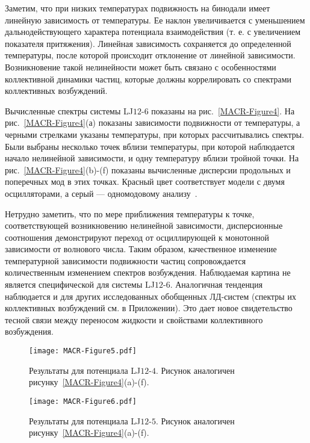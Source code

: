 Заметим, что при низких температурах подвижность на бинодали имеет линейную зависимость от температуры. Ее наклон увеличивается с уменьшением дальнодействующего характера потенциала взаимодействия (т. е. с увеличением показателя притяжения). Линейная зависимость сохраняется до определенной температуры, после которой происходит отклонение от линейной зависимости. Возникновение такой нелинейности может быть связано с особенностями коллективной динамики частиц, которые должны коррелировать со спектрами коллективных возбуждений.

Вычисленные спектры системы LJ$12$-$6$ показаны на рис.~\ref{MACR-Figure4}. На рис.~\ref{MACR-Figure4}(а) показаны зависимости подвижности от температуры, а черными стрелками указаны температуры, при которых рассчитывались спектры. Были выбраны несколько точек вблизи температуры, при которой наблюдается начало нелинейной зависимости, и одну температуру вблизи тройной точки. На рис.~\ref{MACR-Figure4}(b)-(f) показаны вычисленные дисперсии продольных и поперечных мод в этих точках. Красный цвет соответствует модели с двумя осцилляторами, а серый — одномодовому анализу~\cite{10.1038/s41598-019-46979-y}.

Нетрудно заметить, что по мере приближения температуры к точке, соответствующей возникновению нелинейной зависимости, дисперсионные соотношения демонстрируют переход от осциллирующей к монотонной зависимости от волнового числа. Таким образом, качественное изменение температурной зависимости подвижности частиц сопровождается количественным изменением спектров возбуждения. Наблюдаемая картина не является специфической для системы LJ$12$-$6$. Аналогичная тенденция наблюдается и для других исследованных обобщенных ЛД-систем (спектры их коллективных возбуждений см. в Приложении). Это дает новое свидетельство тесной связи между переносом жидкости и свойствами коллективного возбуждения.

\begin{figure}
\centering
 \texttt{[image: MACR-Figure5.pdf]}
 \caption{Результаты для потенциала LJ$12$-$4$. Рисунок аналогичен рисунку~\ref{MACR-Figure4}(a)-(f).}
\label{MACR-Figure5}
\end{figure}


\begin{figure}
\centering
 \texttt{[image: MACR-Figure6.pdf]}
 \caption{Результаты для потенциала LJ$12$-$5$. Рисунок аналогичен рисунку~\ref{MACR-Figure4}(a)-(f).}
\label{MACR-Figure6}
\end{figure}


